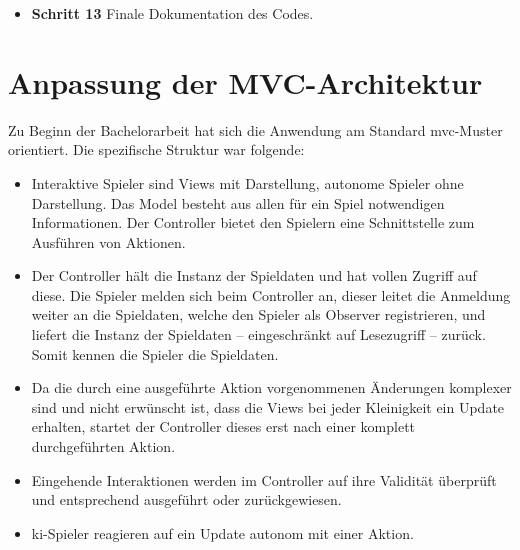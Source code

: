 \documentclass[
							a4paper, 
							11pt, 
							openany, 
							liststotoc,
							parskip=half, 
   							headings=normal
						]{scrreprt}
\begin{document}
{\begin{itemize}
\begin{itemize}
\begin{itemize}
	\end{itemize}
	\item Schritt 12.6 : Persistenz von Testdaten.
	\item Schritt 12.8 : Determinismus-Test\newline
Ein abgespeichertes Testspiel wird unter gleichen Bedingungen wiederholt. Anschließend werden die Abläufe beider Spiele auf Gleichheit überprüft. Für diesen Tests wird eine einfache deterministische \acs{ki} implementiert.	
	\item Schritt 12.9 : Selbst definierter Stack\newline
Laden von vorgegebenen Stacks aus einer XML Datei, um Spiele mit gegebenen Karten zu spielen.
	\item Schritt 12.10 : Zusätzliche Funktionalitäten für Testumgebung\newline
Interaktives Spiel, Ausgabe von abgespeicherten Testfällen und ein Konsolenmenü zum Ausführen und Darstellen der Tests wird eingebaut.
	\end{itemize}
	\item \textbf{Schritt 13} Finale Dokumentation des Codes.
\end{itemize}

\clearpage

\section{Anpassung der MVC-Architektur} \label{se:anwendung_custom_mvc}
Zu Beginn der Bachelorarbeit hat sich die Anwendung am Standard \acs{mvc}-Muster orientiert.
Die spezifische Struktur war folgende:
\begin{itemize}
	\item Interaktive Spieler sind Views mit Darstellung, autonome Spieler ohne Darstellung. Das Model besteht aus allen für ein Spiel notwendigen Informationen. Der Controller bietet den Spielern eine Schnittstelle zum Ausführen von Aktionen.
	\item Der Controller hält die Instanz der Spieldaten und hat vollen Zugriff auf diese. Die Spieler melden sich beim Controller an, dieser leitet die Anmeldung weiter an die Spieldaten, welche den Spieler als Observer registrieren, und liefert die Instanz der Spieldaten -- eingeschränkt auf Lesezugriff -- zurück. Somit kennen die Spieler die Spieldaten.
	\item Da die durch eine ausgeführte Aktion vorgenommenen Änderungen komplexer sind und nicht erwünscht ist, dass die Views bei jeder Kleinigkeit ein Update erhalten, startet der Controller dieses erst nach einer komplett durchgeführten Aktion.
	\item Eingehende Interaktionen werden im Controller auf ihre Validität überprüft und entsprechend ausgeführt oder zurückgewiesen.
	\item \acs{ki}-Spieler reagieren auf ein Update autonom mit einer Aktion.
\end{itemize}

}
\end{document}
